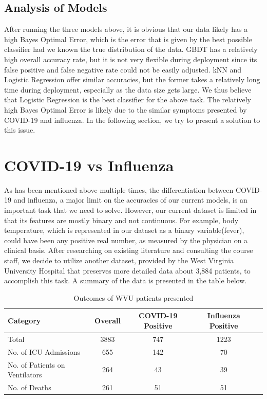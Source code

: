 \documentclass[a4paper, 11pt]{article}
\begin{document}
\subsection*{Analysis of Models}
After running the three models above, it is obvious that our data likely has a high Bayes Optimal Error, which is the error that is given by the best possible classifier had we known the true distribution of the data. GBDT has a relatively high overall accuracy rate, but it is not very flexible during deployment since its false positive and false negative rate could not be easily adjusted. kNN and Logistic Regression offer similar accuracies, but the former takes a relatively long time during deployment, especially as the data size gets large. We thus believe that Logistic Regression is the best classifier for the above task.
The relatively high Bayes Optimal Error is likely due to the similar symptoms presented by COVID-19 and influenza. In the following section, we try to present a solution to this issue.

\section*{COVID-19 vs Influenza}
As has been mentioned above multiple times, the differentiation between COVID-19 and influenza, a major limit on the accuracies of our current models, is an important task that we need to solve. However, our current dataset is limited in that its features are mostly binary and not continuous. For example, body temperature, which is represented in our dataset as a binary variable(fever), could have been any positive real number, as measured by the physician on a clinical basis. After researching on existing literature and consulting the course staff, we decide to utilize another dataset, provided by the West Virginia University Hospital that preserves more detailed data about 3,884 patients, to accomplish this task. A summary of the data is presented in the table below.

\begin{table}[H]
\centering
\caption{Outcomes of WVU patients presented}
\begin{tabular}{| l | c | c | c | c |}
\hline
Category & Overall & COVID-19 Positive & Influenza Positive  \\ \hline
Total & 3883 & 747 & 1223  \\ \hline
No. of ICU Admissions & 655 & 142 & 70  \\ \hline
No. of Patients on Ventilators & 264 & 43 & 39  \\ \hline
No. of Deaths & 261 & 51 & 51  \\ 
\hline
\end{tabular}
\label{Table}
\end{table}
\end{document}

